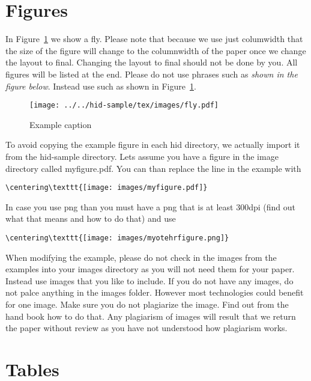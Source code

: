 \section{Figures}

In Figure~\ref{f:fly} we show a fly. Please note that because we use
just columwidth that the size of the figure will change to the
columnwidth of the paper once we change the layout to final. Changing
the layout to final should not be done by you. All figures will be
listed at the end.  Please do not use phrases such as \textit{shown in
  the figure below}. Instead use such as shown in Figure~\ref{f:fly}.

\begin{figure}[!ht]
  \centering\texttt{[image: ../../hid-sample/tex/images/fly.pdf]}
  \caption{Example caption}\label{f:fly}
\end{figure}

To avoid copying the example figure in each hid directory, we actually
import it from the hid-sample directory. Lets assume you have a figure
in the image directory called myfigure.pdf. You can than replace the
line in the example with

\begin{verbatim}
\centering\texttt{[image: images/myfigure.pdf]}
\end{verbatim}

In case you use png than you must have a png that is at least 300dpi
(find out what that means and how to do that) and use 

\begin{verbatim}
\centering\texttt{[image: images/myotehrfigure.png]}
\end{verbatim}

When modifying the example, please do not check in the images from the
examples into your images directory as you will not need them for your
paper. Instead use images that you like to include. If you do not have
any images, do not palce anything in the images folder. However most
technologies could benefit for one image. Make sure you do not
plagiarize the image. Find out from the hand book how to do that. Any
plagiarism of images will result that we return the paper without
review as you have not understood how plagiarism works.

\section{Tables}

